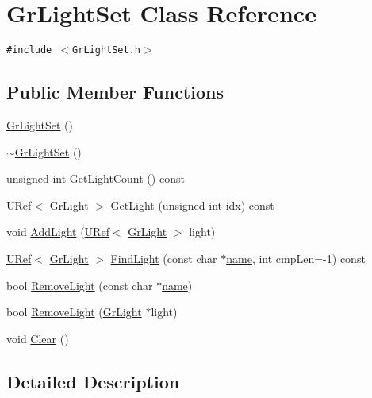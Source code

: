 \hypertarget{class_gr_light_set}{
\section{GrLightSet Class Reference}
\label{class_gr_light_set}
}
{\tt \#include $<$GrLightSet.h$>$}

\subsection*{Public Member Functions}
\begin{CompactItemize}
\item 
\hyperlink{class_gr_light_set_7c0e9bb00cd90e2221fa05bb801cd0f2}{GrLightSet} ()
\item 
\hyperlink{class_gr_light_set_7e2ec00f0420faaf3c3e09435fe720dd}{$\sim$GrLightSet} ()
\item 
unsigned int \hyperlink{class_gr_light_set_84ba0f2e031e85dd61804cb4576162d4}{GetLightCount} () const 
\item 
\hyperlink{class_u_ref}{URef}$<$ \hyperlink{class_gr_light}{GrLight} $>$ \hyperlink{class_gr_light_set_d51c91ea2e968be0162405c7ebb2fd6f}{GetLight} (unsigned int idx) const 
\item 
void \hyperlink{class_gr_light_set_79b499c840d066ad287884eed9568e13}{AddLight} (\hyperlink{class_u_ref}{URef}$<$ \hyperlink{class_gr_light}{GrLight} $>$ light)
\item 
\hyperlink{class_u_ref}{URef}$<$ \hyperlink{class_gr_light}{GrLight} $>$ \hyperlink{class_gr_light_set_39b0504fea42913aa6b969a32595685e}{FindLight} (const char $\ast$\hyperlink{glext__bak_8h_bb62efe59ccdd153ce42e1a418352209}{name}, int cmpLen=-1) const 
\item 
bool \hyperlink{class_gr_light_set_0f600be8bb1804bd6e6161399526fe33}{RemoveLight} (const char $\ast$\hyperlink{glext__bak_8h_bb62efe59ccdd153ce42e1a418352209}{name})
\item 
bool \hyperlink{class_gr_light_set_2d133642b03d6180270899da9d6b6823}{RemoveLight} (\hyperlink{class_gr_light}{GrLight} $\ast$light)
\item 
void \hyperlink{class_gr_light_set_2a1f2158ae16c06155675d31d2e77e72}{Clear} ()
\end{CompactItemize}


\subsection{Detailed Description}


